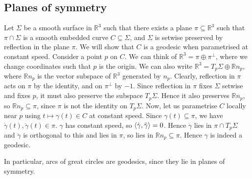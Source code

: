 \subsection{Planes of symmetry}
Let \( \Sigma \) be a smooth surface in \( \mathbb R^3 \) such that there exists a plane \( \pi \subseteq \mathbb R^3 \) such that \( \pi \cap \Sigma \) is a smooth embedded curve \( C \subseteq \Sigma \), and \( \Sigma \) is setwise preserved by reflection in the plane \( \pi \).
We will show that \( C \) is a geodesic when parametrised at constant speed.
Consider a point \( p \) on \( C \).
We can think of \( \mathbb R^3 = \pi \oplus \pi^\perp \), where we change coordinates such that \( p \) is the origin.
We can also write \( \mathbb R^3 = T_p \Sigma \oplus \mathbb R n_p \), where \( \mathbb R n_p \) is the vector subspace of \( \mathbb R^3 \) generated by \( n_p \).
Clearly, reflection in \( \pi \) acts on \( \pi \) by the identity, and on \( \pi^\perp \) by \( -1 \).
Since reflection in \( \pi \) fixes \( \Sigma \) setwise and fixes \( p \), it must also preserve the subspace \( T_p \Sigma \).
Hence it also preserves \( \mathbb R n_p \), so \( \mathbb R n_p \subseteq \pi \), since \( \pi \) is not the identity on \( T_p \Sigma \).
Now, let us parametrise \( C \) locally near \( p \) using \( t \mapsto \gamma(t) \in C \) at constant speed.
Since \( \gamma(t) \subseteq \pi \), we have \( \dot \gamma(t), \ddot \gamma(t) \in \pi \).
\( \gamma \) has constant speed, so \( \left\langle{\dot \gamma, \ddot \gamma}\right\rangle = 0 \).
Hence \( \dot \gamma \) lies in \( \pi \cap T_p \Sigma \) and \( \ddot \gamma \) is orthogonal to this and lies in \( \pi \), so lies in \( \mathbb R n_p \subseteq \pi \).
Hence \( \gamma \) is indeed a geodesic.

In particular, arcs of great circles are geodesics, since they lie in planes of symmetry.

